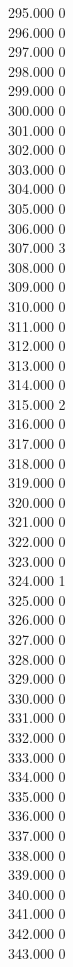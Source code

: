 { 295.000	0 \\
 296.000	0 \\
 297.000	0 \\
 298.000	0 \\
 299.000	0 \\
 300.000	0 \\
 301.000	0 \\
 302.000	0 \\
 303.000	0 \\
 304.000	0 \\
 305.000	0 \\
 306.000	0 \\
 307.000	3 \\
 308.000	0 \\
 309.000	0 \\
 310.000	0 \\
 311.000	0 \\
 312.000	0 \\
 313.000	0 \\
 314.000	0 \\
 315.000	2 \\
 316.000	0 \\
 317.000	0 \\
 318.000	0 \\
 319.000	0 \\
 320.000	0 \\
 321.000	0 \\
 322.000	0 \\
 323.000	0 \\
 324.000	1 \\
 325.000	0 \\
 326.000	0 \\
 327.000	0 \\
 328.000	0 \\
 329.000	0 \\
 330.000	0 \\
 331.000	0 \\
 332.000	0 \\
 333.000	0 \\
 334.000	0 \\
 335.000	0 \\
 336.000	0 \\
 337.000	0 \\
 338.000	0 \\
 339.000	0 \\
 340.000	0 \\
 341.000	0 \\
 342.000	0 \\
 343.000	0 \\
}
